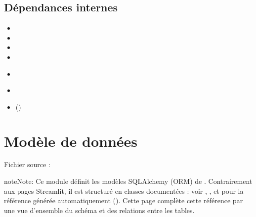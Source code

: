 \documentclass[letterpaper,10pt,english]{sphinxmanual}
\begin{document}
\section{Dépendances internes}
\label{\detokenize{5_Management:dependances-internes}}\begin{itemize}
\item {} 
\sphinxAtStartPar
{}

\item {} 
\sphinxAtStartPar
{}

\item {} 
\sphinxAtStartPar
{}

\item {} 
\sphinxAtStartPar
{}

\item {} 
\sphinxAtStartPar
{\hyperref[\detokenize{api:utils.molecular_weight.molecular_weight}]{}}

\item {} 
\sphinxAtStartPar
{\hyperref[\detokenize{api:utils.monoisotopic.monoisotopic_mass}]{}}

\item {} 
\sphinxAtStartPar
{\hyperref[\detokenize{api:module-config}]{}} ()

\end{itemize}

\sphinxstepscope


\chapter{Modèle de données}
\label{\detokenize{model:modele-de-donnees}}\label{\detokenize{model::doc}}
\sphinxAtStartPar
Fichier source : 

\begin{sphinxadmonition}{note}{Note:}
\sphinxAtStartPar
Ce module définit les modèles SQLAlchemy (ORM) de . Contrairement aux
pages Streamlit, il est structuré en classes documentées : voir {\hyperref[\detokenize{api:models.model.Detection}]{}},
{\hyperref[\detokenize{api:models.model.Fragment}]{}}, {\hyperref[\detokenize{api:models.model.Lipid}]{}} et {\hyperref[\detokenize{api:models.model.Annotation}]{}}
pour la référence générée automatiquement (). Cette page complète cette
référence par une vue d’ensemble du schéma et des relations entre les tables.
\end{sphinxadmonition}
\end{document}
